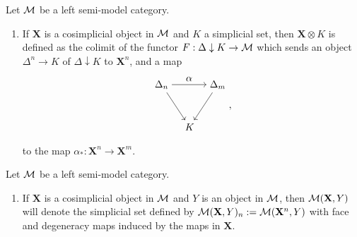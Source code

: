 \documentclass{amsart}
\begin{document}
\begin{defn}\cite[Def. 16.3.1]{Hirshhorn}
    Let $\mathcal{M}$ be a left semi-model category.
    \begin{enumerate}
        \item If $\mathbf{X}$ is a cosimplicial object in $\mathcal{M}$ and $K$ a simplicial set, then $\mathbf{X}\otimes K$ is defined as the colimit of the functor $F:\Delta\downarrow K\to\mathcal{M}$ which sends an object $\Delta^n\to K$ of $\Delta\downarrow K$ to $\mathbf{X}^n$, and a map
        \[\begin{matrix}\begin{tikzpicture}
            \node (A) at (0,0) {$\Delta_n$};
            \node (X) at (2,0) {$\Delta_m$};
            \node (B) at (1,-1.5) {$K$};
            \draw[->] (A) to (B);
            \draw[->] (A) to node[above]{$\alpha$} (X);
            \draw[->] (X) to (B);
        \end{tikzpicture}\end{matrix},\]
        to the map $\alpha_*:\mathbf{X}^n\to\mathbf{X}^m$.
    \end{enumerate}
\end{defn}

\begin{notn}\cite[Not. 16.4.1]{Hirshhorn}
    Let $\mathcal{M}$ be a left semi-model category.
    \begin{enumerate}
        \item If $\mathbf{X}$ is a cosimplicial object in $\mathcal{M}$ and $Y$ is an object in $\mathcal{M}$, then $\mathcal{M}(\mathbf{X},Y)$ will denote the simplicial set defined by $\mathcal{M}(\mathbf{X},Y)_n:=\mathcal{M}(\mathbf{X}^n,Y)$ with face and degeneracy maps induced by the maps in $\mathbf{X}$.
    \end{enumerate}
\end{notn}
\end{document}
